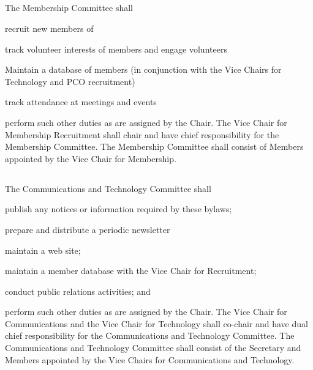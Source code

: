 \subsection{} \label{membership-committee}
The Membership Committee shall
\begin{inlinealphalist}
    \item recruit new members of \thedistrict{}
    \item track volunteer interests of members and engage volunteers
    \item Maintain a database of members (in conjunction with the Vice Chairs for Technology and PCO recruitment)
    \item track attendance at \district{} meetings and events
    \item perform such other duties as are assigned by the Chair. The Vice Chair for Membership Recruitment shall chair and have chief responsibility for the Membership Committee. The Membership Committee shall consist of Members appointed by the Vice Chair for Membership.
\end{inlinealphalist}

\subsection{} \label{comms-tech-committee}
The Communications and Technology Committee shall
\begin{inlinealphalist}
    \item publish any notices or information required by these bylaws;
    \item prepare and distribute a periodic newsletter
    \item maintain a web site;
    \item maintain a member database with the Vice Chair for Recruitment;
    \item conduct public relations activities; and
    \item perform such other duties as are assigned by the Chair. The Vice Chair for Communications and the Vice Chair for Technology shall co-chair and have dual chief responsibility for the Communications and Technology Committee. The Communications and Technology Committee shall consist of the Secretary and Members appointed by the Vice Chairs for Communications and Technology.
\end{inlinealphalist}


